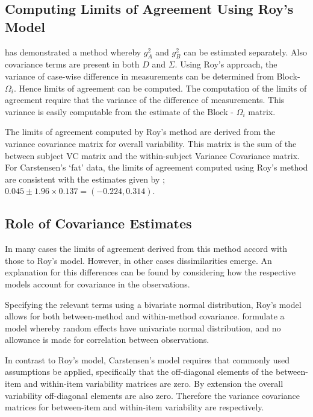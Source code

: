 \documentclass[12pt, a4paper]{report}
\theoremstyle{plain}
\theoremstyle{definition}
\theoremstyle{remark}
\begin{document}
\subsection*{Computing Limits of Agreement Using Roy's Model}
\citet{ARoy2009} has demonstrated a method whereby $g^2_{A}$ and $g^2_{B}$ can be estimated separately. Also covariance terms are present in both ${D}$ and ${\Sigma}$. Using Roy's approach, the variance of case-wise difference in measurements can be determined from Block-${\Omega}_{i}$. Hence limits of agreement can be computed. The computation of the limits of agreement require that the variance of the difference of measurements. This variance is easily computable from the estimate of the ${\mbox{Block - } \Omega_{i}}$ matrix.



The limits of agreement computed by Roy's method are derived from the variance covariance matrix for overall variability.
This matrix is the sum of the between subject VC matrix and the within-subject Variance Covariance matrix. For Carstensen's `fat' data, the limits of agreement computed using Roy's
	method are consistent with the estimates given by \citet{BXC2008}; $0.045 \pm 1.96 \times  0.137 = (-0.224,  0.314).$
	
		
\subsection*{Role of Covariance Estimates}
In many cases the limits of agreement derived from this method accord with those to Roy's model. However, in other cases dissimilarities emerge. An explanation for this differences can be found by considering how the respective models account for covariance in the observations. 
	
Specifying the relevant terms using a bivariate normal distribution, Roy's model allows for both between-method and within-method covariance. \citet{BXC2008} formulate a model whereby random effects have univariate normal distribution, and no allowance is made for correlation between observations.
	
In contrast to Roy's model, Carstensen's model requires that commonly used assumptions be applied, specifically that the off-diagonal elements of the between-item and within-item variability matrices are zero. By extension the overall variability off-diagonal elements are also zero. Therefore the variance covariance matrices for between-item and within-item variability are respectively.
	
\end{document}

